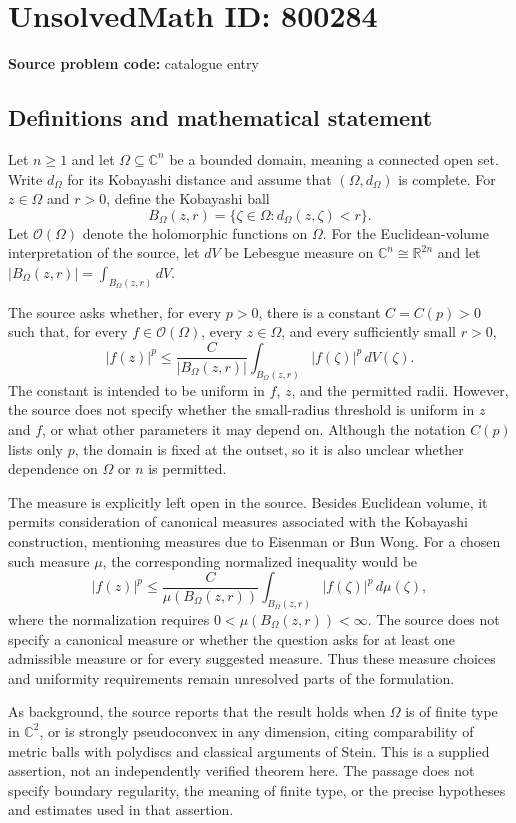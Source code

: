 \documentclass[11pt]{article}
\newcommand{\R}{\mathbb{R}}
\newcommand{\C}{\mathbb{C}}
\begin{document}
\section*{UnsolvedMath ID: 800284}
\textbf{Source problem code:} catalogue entry
\subsection{Definitions and mathematical statement}
Let \(n\geq 1\) and let \(\Omega\subseteq\C^n\) be a bounded domain, meaning a connected open set. Write \(d_\Omega\) for its Kobayashi distance and assume that \((\Omega,d_\Omega)\) is complete. For \(z\in\Omega\) and \(r>0\), define the Kobayashi ball
\[
B_\Omega(z,r)=\{\zeta\in\Omega:d_\Omega(z,\zeta)<r\}.
\]
Let \(\mathcal O(\Omega)\) denote the holomorphic functions on \(\Omega\). For the Euclidean-volume interpretation of the source, let \(dV\) be Lebesgue measure on \(\C^n\cong\R^{2n}\) and let \(|B_\Omega(z,r)|=\int_{B_\Omega(z,r)}dV\).

The source asks whether, for every \(p>0\), there is a constant \(C=C(p)>0\) such that, for every \(f\in\mathcal O(\Omega)\), every \(z\in\Omega\), and every sufficiently small \(r>0\),
\[
|f(z)|^p\leq \frac{C}{|B_\Omega(z,r)|}\int_{B_\Omega(z,r)}|f(\zeta)|^p\,dV(\zeta).
\]
The constant is intended to be uniform in \(f\), \(z\), and the permitted radii. However, the source does not specify whether the small-radius threshold is uniform in \(z\) and \(f\), or what other parameters it may depend on. Although the notation \(C(p)\) lists only \(p\), the domain is fixed at the outset, so it is also unclear whether dependence on \(\Omega\) or \(n\) is permitted.

The measure is explicitly left open in the source. Besides Euclidean volume, it permits consideration of canonical measures associated with the Kobayashi construction, mentioning measures due to Eisenman or Bun Wong. For a chosen such measure \(\mu\), the corresponding normalized inequality would be
\[
|f(z)|^p\leq \frac{C}{\mu(B_\Omega(z,r))}\int_{B_\Omega(z,r)}|f(\zeta)|^p\,d\mu(\zeta),
\]
where the normalization requires \(0<\mu(B_\Omega(z,r))<\infty\). The source does not specify a canonical measure or whether the question asks for at least one admissible measure or for every suggested measure. Thus these measure choices and uniformity requirements remain unresolved parts of the formulation.

As background, the source reports that the result holds when \(\Omega\) is of finite type in \(\C^2\), or is strongly pseudoconvex in any dimension, citing comparability of metric balls with polydiscs and classical arguments of Stein. This is a supplied assertion, not an independently verified theorem here. The passage does not specify boundary regularity, the meaning of finite type, or the precise hypotheses and estimates used in that assertion.
\end{document}
